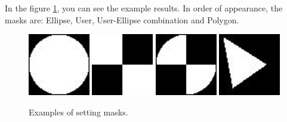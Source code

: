 In the figure \ref{fig:mask}, you can see the example results.
In order of appearance, the masks are: Ellipse, User, User-Ellipse combination and Polygon. 
\begin{figure}[htbp] 
\begin{center}
 \includegraphics[width=0.24\textwidth]{vision/figures/Ellipse}  
 \includegraphics[width=0.24\textwidth]{vision/figures/User}  
 \includegraphics[width=0.24\textwidth]{vision/figures/And}
 \includegraphics[width=0.24\textwidth]{vision/figures/Polygon}  \\ 
 \caption{Examples of setting masks.}
\label{fig:mask}
\end{center}
\end{figure} 
